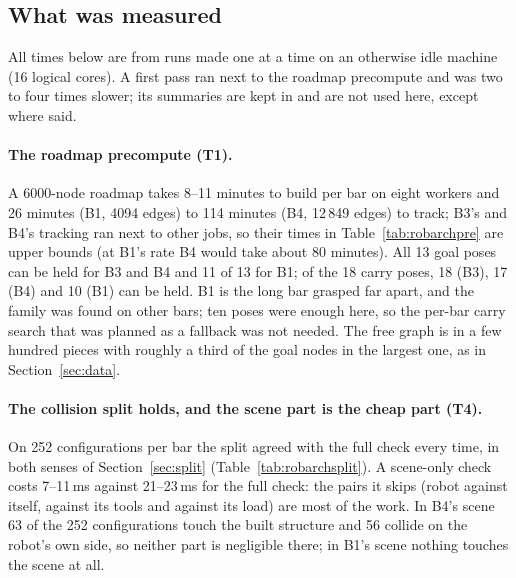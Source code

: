\subsection{What was measured}

All times below are from runs made one at a time on an otherwise idle machine
(16 logical cores). A first pass ran next to the roadmap precompute and was two to
four times slower; its summaries are kept in
 and are not used here, except where
said.

\paragraph{The roadmap precompute (T1).} A 6000-node roadmap takes 8--11 minutes to
build per bar on eight workers and 26 minutes (B1, 4094 edges) to 114 minutes
(B4, 12\,849 edges) to track; B3's and B4's tracking ran next to other jobs, so their
times in Table~\ref{tab:robarchpre} are upper bounds (at B1's rate B4 would take
about 80 minutes). All 13 goal poses can be held for B3 and B4 and 11 of 13 for B1;
of the 18 carry poses, 18 (B3), 17 (B4) and 10 (B1) can be held. B1 is the long bar
grasped far apart, and the family was found on other bars; ten poses were enough
here, so the per-bar carry search that was planned as a fallback was not needed.
The free graph is in a few hundred pieces with roughly a third of the goal nodes
in the largest one, as in Section~\ref{sec:data}.

\paragraph{The collision split holds, and the scene part is the cheap part (T4).}
On 252 configurations per bar the split agreed with the full check every time, in
both senses of Section~\ref{sec:split} (Table~\ref{tab:robarchsplit}). A scene-only
check costs 7--11\,ms against 21--23\,ms for the full check: the pairs it skips
(robot against itself, against its tools and against its load) are most of the
work. In B4's scene 63 of the 252 configurations touch the built structure and 56
collide on the robot's own side, so neither part is negligible there; in B1's
scene nothing touches the scene at all.

